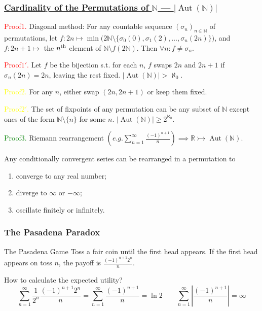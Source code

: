\documentclass[UTF8,11pt,colorlinks,compress,openany]{beamer}%
\begin{document}
\begin{frame}\frametitle{\href{https://mathoverflow.net/questions/29475/an-easy-proof-of-the-uncountability-of-bijections-on-natural-numbers}{Cardinality of the Permutations of $\mathbb{N}$ --- $|\operatorname{Aut}(\mathbb{N})|$}}
	\textcolor{red}{Proof$1$.} Diagonal method: For any countable sequence $(\sigma_n)_{n\in\mathbb{N}}$ of permutations, let $f: 2n\mapsto \min\big(2\mathbb{N}\setminus\{\sigma_0(0),\sigma_1(2),\dots,\sigma_n(2n)\}\big)$, and $f: 2n+1\mapsto$ the $n\textsuperscript{th}$ element of $\mathbb{N}\setminus f(2\mathbb{N})$. Then $\forall n: f\ne\sigma_n$.
	
	\textcolor{red}{Proof$1'$.} Let $f$ be the bijection s.t. for each $n$, $f$ swaps $2n$ and $2n+1$ if $\sigma_n(2n)=2n$, leaving the rest fixed. $|\operatorname{Aut}(\mathbb{N})|>\aleph_0$.
	
	\textcolor{yellow}{Proof$2$.} For any $n$, either swap $(2n,2n+1)$ or keep them fixed.
	
	\textcolor{yellow}{Proof$2'$.} The set of fixpoints of any permutation can be any subset of $\mathbb{N}$ except ones of the form $\mathbb{N}\setminus\{n\}$ for some $n$. $|\operatorname{Aut}(\mathbb{N})|\geq 2^{\aleph_0}$.
	
	\textcolor{green}{Proof$3$.} Riemann rearrangement $\left(e.g. \sum\limits_{n=1}^\infty\frac{(-1)^{n+1}}{n}\right)\implies\mathbb{R}\rightarrowtail\operatorname{Aut}(\mathbb{N})$.

	\begin{theorem}
		Any conditionally convergent series can be rearranged in a permutation to
		\begin{enumerate}
			\item converge to any real number;
			\item diverge to $\infty$ or $-\infty$;
			\item oscillate finitely or infinitely.
		\end{enumerate}
	\end{theorem}
\vspace*{-12ex}
\end{frame}

\begin{frame}\frametitle{The Pasadena Paradox}
\begin{block}{The Pasadena Game}
Toss a fair coin until the first head appears. If the first head appears on toss $n$, the payoff is $\frac{(-1)^{n+1}2^n}{n}$.
\end{block}
How to calculate the expected utility?
\[\sum\limits_{n=1}^\infty\frac{1}{2^n}\frac{(-1)^{n+1}2^n}{n}=\sum\limits_{n=1}^\infty\frac{(-1)^{n+1}}{n}=\ln 2\qquad \sum\limits_{n=1}^\infty\left|\frac{(-1)^{n+1}}{n}\right|=\infty\]
\end{frame}
\end{document}
